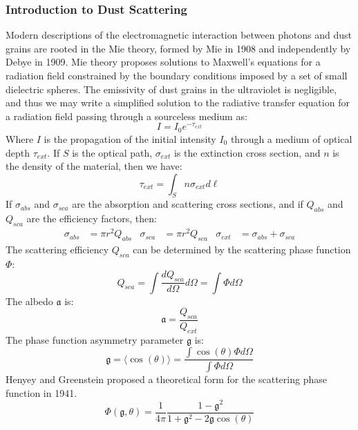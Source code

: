 \documentclass[10pt]{article}
\theoremstyle{definition}
\begin{document}
\subsubsection*{Introduction to Dust Scattering}
Modern descriptions of the electromagnetic interaction between photons and dust grains are rooted in the Mie theory, formed by Mie in 1908 and independently by Debye in 1909. Mie theory proposes solutions to Maxwell's equations for a radiation field constrained by the boundary conditions imposed by a set of small dielectric spheres. The emissivity of dust grains in the ultraviolet is negligible, and thus we may write a simplified solution to the radiative transfer equation for a radiation field passing through a sourceless medium as:
\begin{equation}
I = I_0 e^{-\tau_{ext}}
\end{equation}
Where $I$ is the propagation of the initial intensity $I_0$ through a medium of optical depth $\tau_{ext}$. If $S$ is the optical path, $\sigma_{ext}$ is the extinction cross section, and $n$ is the density of the material, then we have:
\begin{equation}
\tau_{ext} = \int_{S} n \sigma_{ext} d\ell
\end{equation}
If $\sigma_{abs}$ and $\sigma_{sca}$ are the absorption and scattering cross sections, and if $Q_{abs}$ and $Q_{sca}$ are the efficiency factors, then:
\begin{align}
\sigma_{abs} &= \pi r^2 Q_{abs} & \sigma_{sca} &= \pi r^2 Q_{sca} & \sigma_{ext} &= \sigma_{abs}+\sigma_{sca}
\end{align}
The scattering efficiency $Q_{sca}$ can be determined by the scattering phase function $\Phi$:
\begin{equation}
Q_{sca} = \int \frac{dQ_{sca}}{d\Omega}d\Omega = \int \Phi d\Omega
\end{equation}
The albedo $\mathfrak{a}$ is:
\begin{equation}
\mathfrak{a} = \frac{Q_{sca}}{Q_{ext}}
\end{equation}
The phase function asymmetry parameter $\mathfrak{g}$ is:
\begin{equation}
\mathfrak{g} = \langle \cos(\theta)\rangle = \frac{\int \cos(\theta)\Phi d\Omega}{\int \Phi d\Omega}
\end{equation}
Henyey and Greenstein proposed a theoretical form for the scattering phase function in 1941.
\begin{equation}
\Phi(\mathfrak{g},\theta) = \frac{1}{4\pi} \frac{1-\mathfrak{g}^2}{1+\mathfrak{g}^2-2\mathfrak{g}\cos(\theta)}
\end{equation}
\end{document}
